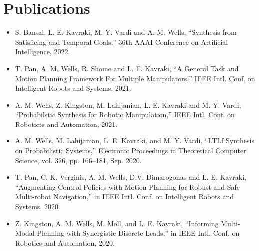 \section{Publications}

\vspace{6pt}

\begin{itemize}

\item[]{S. Bansal, L. E. Kavraki, M. Y. Vardi and A. M. Wells, ``Synthesis from Satisficing and Temporal Goals,'' 36th AAAI Conference on Artificial Intelligence, 2022. }

\vspace{1em} 

\item[]{T. Pan, A. M. Wells, R. Shome and L. E. Kavraki, ``A General Task and Motion Planning Framework For Multiple Manipulators,'' IEEE Intl. Conf. on Intelligent Robots and Systems, 2021.}

\vspace{1em} 

\item[] {A. M. Wells, Z. Kingston, M. Lahijanian, L. E. Kavraki and M. Y. Vardi, ``Probabilstic Synthesis for Robotic Manipulation,'' IEEE Intl. Conf. on Roboticts and Automation, 2021.}

\vspace{1em} 

\item[]{A. M. Wells, M. Lahijanian, L. E. Kavraki, and M. Y. Vardi, “LTLf Synthesis on Probabilistic Systems,” Electronic Proceedings in Theoretical Computer Science, vol. 326, pp. 166–181, Sep. 2020.}

\vspace{1em} 

\item[]{T. Pan, C. K. Verginis, A. M. Wells, D.V. Dimarogonas and L. E. Kavraki, “Augmenting Control Policies with Motion Planning for Robust and Safe Multi-robot Navigation,” in IEEE Intl. Conf. on Intelligent Robots and Systems, 2020.}

\vspace{1em} 

\item[]{Z. Kingston, A. M. Wells, M. Moll, and L. E. Kavraki, “Informing Multi-Modal Planning with Synergistic Discrete Leads,” in IEEE Intl. Conf. on Robotics and Automation, 2020.}

\vspace{1em} 


\end{itemize}
